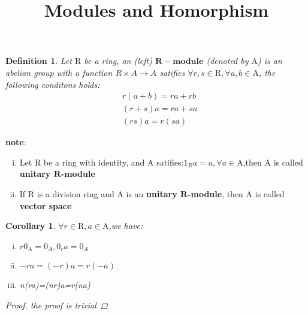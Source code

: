 \documentclass[a4paper]{article}
\title{Modules and Homorphism}
\newtheorem{myDef}{Definition}
\newtheorem{myCol}{Corollary}
\begin{document}
    \maketitle
    \begin{myDef}
        Let $\mathrm{R}$ be a ring, an (left) $\mathbf{R-module}$ (denoted by $\mathrm{A}$) is an abelian group
        with a function $R\times A\rightarrow A$ satifies $\forall r,s \in \mathrm{R}, \forall a,b\in \mathrm{A}$,
        the following conditons holds:
        $$
        \begin{aligned}
        &r(a+b)=ra+rb\\
        &(r+s)a=ra+sa\\
        &(rs)a =r(sa)
        \end{aligned}
        $$
    \end{myDef}
    \noindent
    \textbf{note}:
    \begin{enumerate}[(i)]
        \item Let $\mathrm{R}$ be a ring with identity, and $\mathrm{A}$ satifies:$1_Ra=a, \forall a\in \mathrm{A}$,then $\mathrm{A}$ is called \textbf{unitary $\mathbf{R}$-module}
        \item If $\mathrm{R}$ is a division ring and $\mathrm{A}$ is an \textbf{unitary $\mathbf{R}$-module}, then $\mathrm{A}$ is called \textbf{vector space}\\
    \end{enumerate}
    
    \begin{myCol}
        $\forall r \in \mathrm{R},a\in\mathrm{A}$,we have:
        \begin{enumerate}[(i)]
            \item $r0_A = 0_A,0_ra=0_A$
            \item $-ra=(-r)a=r(-a)$
            \item n(ra)=(nr)a=r(na)
        \end{enumerate}
        \vspace{0.1cm}
        \begin{proof}
            the proof is trivial
        \end{proof}
        \vspace{0.3cm}
    \end{myCol}
    
\end{document}
